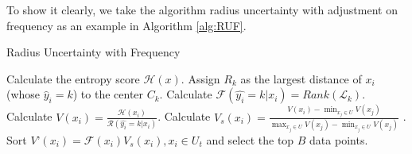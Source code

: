 To show it clearly, we take the algorithm radius uncertainty with adjustment on frequency as an example in Algorithm \ref{alg:RUF}.
\begin{algorithm}
\caption{Radius Uncertainty with Frequency}
\label{alg:RUF}
\begin{algorithmic}
\REPEAT 
\STATE Calculate the entropy score $\mathcal{H}(x)$.
\STATE Assign $R_k$ as the largest distance of $x_i$ (whose $\hat{y}_i = k$) to the center $C_k$.
\STATE Calculate $\mathcal{F}(\hat{y_i} = k|x_i) = Rank(\mathcal{L}_k)$.
\STATE Calculate $V(x_i) = \frac{\mathcal{H}(x_i)}{\mathcal{R}(\hat{y_i}=k|x_i)}$.
\STATE  Calculate $V_s(x_i) = \frac{V(x_i)-\min_{x_j\in U}V(x_j)}{\max_{x_j\in U}V(x_j)-\min_{x_j\in U}V(x_j)}$ .
\STATE Sort $V’(x_i) = \mathcal{F}(x_i) V_s(x_i), x_i \in U_t$ and select the top $B$ data points.
\end{algorithmic}
\end{algorithm}
